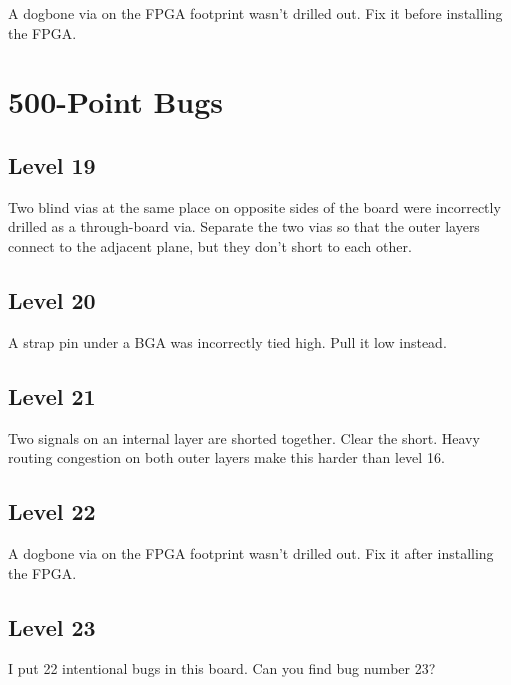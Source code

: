 \documentclass{article}
\begin{document}
A dogbone via on the FPGA footprint wasn't drilled out. Fix it before installing the FPGA.

\pagebreak
\section{500-Point Bugs}

\subsection{Level 19}

Two blind vias at the same place on opposite sides of the board were incorrectly drilled as a through-board via.
Separate the two vias so that the outer layers connect to the adjacent plane, but they don't short to each other.

\subsection{Level 20}

A strap pin under a BGA was incorrectly tied high. Pull it low instead.

\subsection{Level 21}

Two signals on an internal layer are shorted together. Clear the short. Heavy routing congestion on both outer layers
make this harder than level 16.

\subsection{Level 22}

A dogbone via on the FPGA footprint wasn't drilled out. Fix it after installing the FPGA.

\subsection{Level 23}

I put 22 intentional bugs in this board. Can you find bug number 23?
\end{document}

